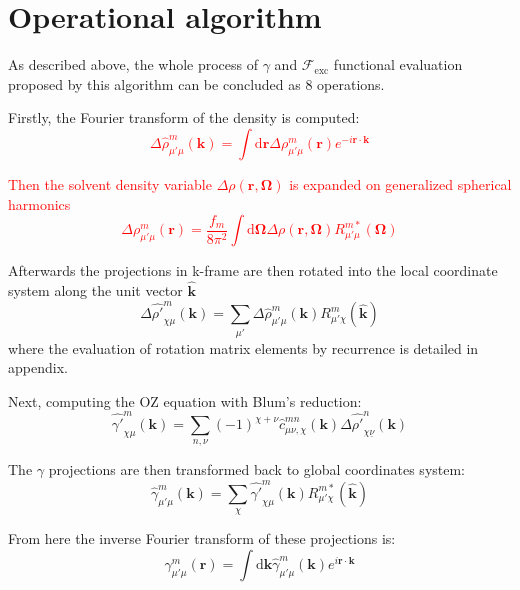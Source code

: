 \section{Operational algorithm\label{sec:Operational-algorithm}}

As described above, the whole process of $\gamma$ and $\mathcal{F}_{\mathrm{exc}}$
functional evaluation proposed by this algorithm can be concluded
as 8 operations.

Firstly, the Fourier transform of the density is computed:\textcolor{red}{
\begin{equation}
\Delta\hat{\rho}_{\mu'\mu}^{m}(\mathbf{k})=\int\mathrm{d}\mathbf{r}\Delta\rho_{\mu'\mu}^{m}(\mathbf{r})e^{-i\mathbf{r}\cdot\mathbf{k}}\label{eq:fft3d-fwd}
\end{equation}
}

\textcolor{red}{Then the solvent density variable $\Delta\rho(\mathbf{r},\mathbf{\Omega})$
is expanded on generalized spherical harmonics
\begin{equation}
\Delta\rho_{\mu'\mu}^{m}(\mathbf{r})=\frac{f_{m}}{8\pi^{2}}\int\mathrm{d}\mathbf{\Omega}\Delta\rho(\mathbf{r},\mathbf{\Omega})R_{\mu'\mu}^{m*}(\mathbf{\Omega})\label{eq:fgsht-fwd}
\end{equation}
}

Afterwards the projections in k-frame are then rotated into the local
coordinate system along the unit vector $\mathbf{\hat{k}}$
\begin{equation}
\Delta\hat{\rho'}_{\chi\mu}^{m}(\mathbf{k})=\sum_{\mu'}\Delta\hat{\rho}_{\mu'\mu}^{m}(\mathbf{k})R_{\mu'\chi}^{m}(\mathbf{\hat{k}})
\end{equation}
where the evaluation of rotation matrix elements by recurrence is
detailed in appendix.

Next, computing the OZ equation with Blum's reduction:
\begin{equation}
\hat{\gamma'}_{\chi\mu}^{m}(\mathbf{k})=\sum_{n,\nu}(-1)^{\chi+\nu}\hat{c}_{\mu\nu,\chi}^{mn}(\mathbf{k})\Delta\hat{\rho'}_{\chi\underline{\nu}}^{n}(\mathbf{k})\label{eq:OZ-2}
\end{equation}

The $\gamma$ projections are then transformed back to global coordinates
system:
\begin{equation}
\hat{\gamma}_{\mu'\mu}^{m}(\mathbf{k})=\sum_{\chi}\hat{\gamma'}_{\chi\mu}^{m}(\mathbf{k})R_{\mu'\chi}^{m*}(\mathbf{\hat{k}})
\end{equation}

From here the inverse Fourier transform of these projections is:
\begin{equation}
\gamma_{\mu'\mu}^{m}(\mathbf{r})=\int\mathrm{d}\mathbf{k}\hat{\gamma}_{\mu'\mu}^{m}(\mathbf{k})e^{i\mathbf{r}\cdot\mathbf{k}}
\end{equation}

